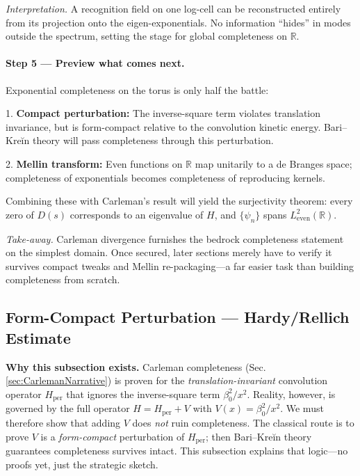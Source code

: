 \documentclass[11pt]{article}
\begin{document}
\emph{Interpretation.}  
A recognition field on one log-cell can be reconstructed entirely from
its projection onto the eigen-exponentials.  
No information “hides” in modes outside the spectrum, setting the
stage for global completeness on \(\mathbb R\).

\vspace{0.4em}
\paragraph{Step 5 — Preview what comes next.}

Exponential completeness on the torus is only half the battle:

1.  \textbf{Compact perturbation:}  
    The inverse-square term violates translation invariance, but is
    form-compact relative to the convolution kinetic energy.  
    Bari–Kreĭn theory will pass completeness through this perturbation.

2.  \textbf{Mellin transform:}  
    Even functions on \(\mathbb R\) map unitarily to a de Branges
    space; completeness of exponentials becomes completeness of
    reproducing kernels.

Combining these with Carleman’s result will yield the surjectivity
theorem: every zero of \(D(s)\) corresponds to an eigenvalue of \(H\),
and \(\{\psi_{n}\}\) spans \(L^{2}_{\mathrm{even}}(\mathbb R)\).

\bigskip
\noindent
\emph{Take-away.}\;
Carleman divergence furnishes the bedrock completeness statement on the
simplest domain.  Once secured, later sections merely have to verify it
survives compact tweaks and Mellin re-packaging—a far easier task than
building completeness from scratch.

\subsection{Form-Compact Perturbation — Hardy/Rellich Estimate}
\label{sec:FormCompactNarrative}

\noindent
\textbf{Why this subsection exists.}\;
Carleman completeness (Sec.​\ref{sec:CarlemanNarrative}) is proven for
the \emph{translation-invariant} convolution operator
\(H_{\mathrm{per}}\) that ignores the inverse-square term
\(\beta_{0}^{2}/x^{2}\).
Reality, however, is governed by the full operator
\(H = H_{\mathrm{per}} + V\) with  
\(
  V(x)=\beta_{0}^{2}/x^{2}.
\)
We must therefore show that adding \(V\) does \emph{not} ruin
completeness.  
The classical route is to prove \(V\) is a \emph{form-compact}
perturbation of \(H_{\mathrm{per}}\); then Bari–Kreĭn theory guarantees
completeness survives intact.  
This subsection explains that logic—no proofs yet, just the strategic
sketch.
\end{document}
